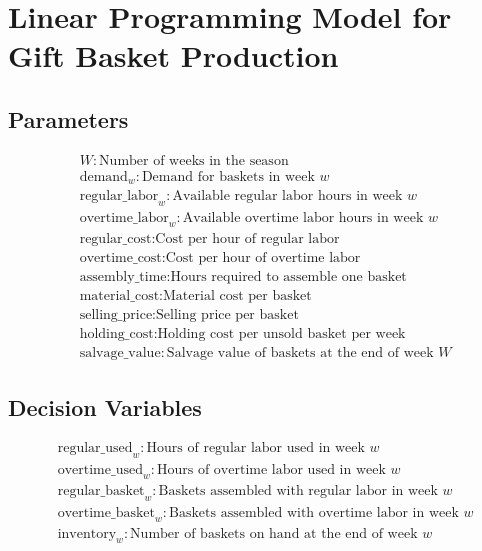 \documentclass{article}
\begin{document}
\section*{Linear Programming Model for Gift Basket Production}

\subsection*{Parameters}
\begin{align*}
    & W: \text{Number of weeks in the season} \\
    & \text{demand}_{w}: \text{Demand for baskets in week } w \\
    & \text{regular\_labor}_{w}: \text{Available regular labor hours in week } w \\
    & \text{overtime\_labor}_{w}: \text{Available overtime labor hours in week } w \\
    & \text{regular\_cost}: \text{Cost per hour of regular labor} \\
    & \text{overtime\_cost}: \text{Cost per hour of overtime labor} \\
    & \text{assembly\_time}: \text{Hours required to assemble one basket} \\
    & \text{material\_cost}: \text{Material cost per basket} \\
    & \text{selling\_price}: \text{Selling price per basket} \\
    & \text{holding\_cost}: \text{Holding cost per unsold basket per week} \\
    & \text{salvage\_value}: \text{Salvage value of baskets at the end of week } W
\end{align*}

\subsection*{Decision Variables}
\begin{align*}
    & \text{regular\_used}_{w}: \text{Hours of regular labor used in week } w \\
    & \text{overtime\_used}_{w}: \text{Hours of overtime labor used in week } w \\
    & \text{regular\_basket}_{w}: \text{Baskets assembled with regular labor in week } w \\
    & \text{overtime\_basket}_{w}: \text{Baskets assembled with overtime labor in week } w \\
    & \text{inventory}_{w}: \text{Number of baskets on hand at the end of week } w
\end{align*}
\end{document}
